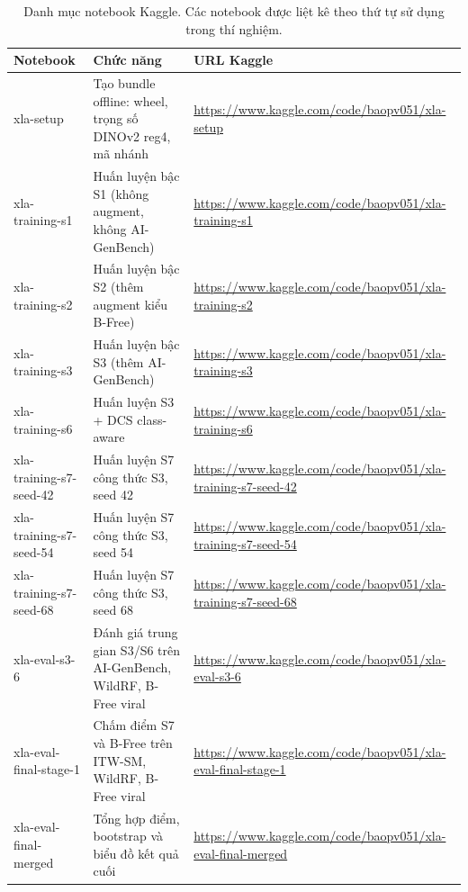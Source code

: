 \documentclass[11pt,a4paper]{article}
\newcommand{\code}[1]{\texttt{\detokenize{#1}}}
\begin{document}
\begin{table}[H]\centering\scriptsize
\caption{Danh mục notebook Kaggle. Các notebook được liệt kê theo thứ tự sử dụng trong thí nghiệm.}
\label{tab:notebooks}
\begin{tabularx}{\linewidth}{p{3.4cm} X p{4.6cm}}
\toprule
Notebook & Chức năng & URL Kaggle \\
\midrule
xla-setup & Tạo bundle offline: wheel, trọng số DINOv2 reg4, mã nhánh \code{integration/loss-backbone} & \url{https://www.kaggle.com/code/baopv051/xla-setup} \\
xla-training-s1 & Huấn luyện bậc S1 (không augment, không AI-GenBench) & \url{https://www.kaggle.com/code/baopv051/xla-training-s1} \\
xla-training-s2 & Huấn luyện bậc S2 (thêm augment kiểu B-Free) & \url{https://www.kaggle.com/code/baopv051/xla-training-s2} \\
xla-training-s3 & Huấn luyện bậc S3 (thêm AI-GenBench) & \url{https://www.kaggle.com/code/baopv051/xla-training-s3} \\
xla-training-s6 & Huấn luyện S3 + DCS class-aware & \url{https://www.kaggle.com/code/baopv051/xla-training-s6} \\
xla-training-s7-seed-42 & Huấn luyện S7 công thức S3, seed 42 & \url{https://www.kaggle.com/code/baopv051/xla-training-s7-seed-42} \\
xla-training-s7-seed-54 & Huấn luyện S7 công thức S3, seed 54 & \url{https://www.kaggle.com/code/baopv051/xla-training-s7-seed-54} \\
xla-training-s7-seed-68 & Huấn luyện S7 công thức S3, seed 68 & \url{https://www.kaggle.com/code/baopv051/xla-training-s7-seed-68} \\
xla-eval-s3-6 & Đánh giá trung gian S3/S6 trên AI-GenBench, WildRF, B-Free viral & \url{https://www.kaggle.com/code/baopv051/xla-eval-s3-6} \\
xla-eval-final-stage-1 & Chấm điểm S7 và B-Free trên ITW-SM, WildRF, B-Free viral & \url{https://www.kaggle.com/code/baopv051/xla-eval-final-stage-1} \\
xla-eval-final-merged & Tổng hợp điểm, bootstrap và biểu đồ kết quả cuối & \url{https://www.kaggle.com/code/baopv051/xla-eval-final-merged} \\
\bottomrule
\end{tabularx}
\end{table}

\clearpage
\end{document}
